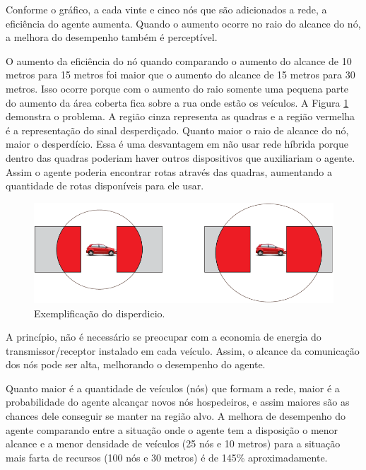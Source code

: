 Conforme o gráfico, a cada vinte e cinco nós que são adicionados a rede, a eficiência do agente aumenta. Quando o aumento ocorre no raio do alcance do nó, a melhora do desempenho também é perceptível. 

O aumento da eficiência do nó quando comparando o aumento do alcance de 10 metros para 15 metros foi maior que o aumento do alcance de 15 metros para 30 metros. Isso ocorre porque com o aumento do raio somente uma pequena parte do aumento da área coberta fica sobre a rua onde estão os veículos. A Figura \ref{fig:problemaDisperdicio} demonstra o problema. A região cinza representa as quadras e a região vermelha é a representação do sinal desperdiçado. Quanto maior o raio de alcance do nó, maior o desperdício. Essa é uma desvantagem em não usar rede híbrida porque dentro das quadras poderiam haver outros dispositivos que auxiliariam o agente. Assim o agente poderia encontrar rotas através das quadras, aumentando a quantidade de rotas disponíveis para ele usar.%

\begin{figure}[htbp]
		\centering
		\includegraphics[scale=0.5]{resultados/figuras/problemaDisperdicio.pdf}
		\caption{Exemplificação do disperdicio.}
		\label{fig:problemaDisperdicio}
	\end{figure}


A princípio, não é necessário se preocupar com a economia de energia do transmissor/receptor instalado em cada veículo. Assim, o alcance da comunicação dos nós pode ser alta, melhorando o desempenho do agente. 

Quanto maior é a quantidade de veículos (nós) que formam a rede, maior é a probabilidade do agente alcançar novos nós hospedeiros, e assim maiores são as chances dele conseguir se manter na região alvo. A melhora de desempenho do agente comparando entre a situação onde o agente tem a disposição o menor alcance e a menor densidade de veículos (25 nós e 10 metros) para a situação mais farta de recursos (100 nós e 30 metros) é de 145\% aproximadamente.   


